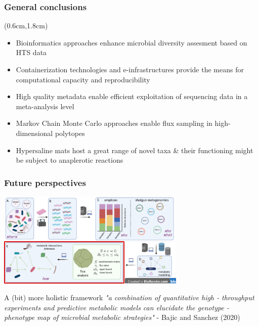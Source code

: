 \documentclass{beamer}
\begin{document}
   \begin{darkframes}

   \begin{frame}
      \frametitle{\textbf{General conclusions}}
      \begin{singlespace}
      \begin{textblock*}{11cm}(0.6cm,1.8cm)
      \small 
      \begin{itemize}
      
         \item Bioinformatics approaches enhance microbial diversity assesment based on HTS data
         \bigskip
         \item Containerization technologies and e-infrastructures provide the means for computational capacity and reproducibility
         \bigskip
         \item High quality metadata enable efficient exploitation of sequencing data in a meta-analysis level
         \bigskip
         \item Markov Chain Monte Carlo approaches enable flux sampling in high-dimensional polytopes 
         \bigskip
         \item Hypersaline mats host a great range of novel taxa \& their functioning might be subject to anaplerotic reactions
      \end{itemize}
      \end{textblock*}
   \end{singlespace}
   \end{frame}

   \begin{frame}
      \frametitle{Future perspectives}

      \includegraphics[width=90mm]{resources/reverse_ecology_transp_future.png}

      \begin{block}{A (bit) more holistic framework}
         \small
         \textit{
            "a combination of quantitative high - throughput experiments and predictive metabolic
            models can elucidate the genotype - phenotype map of microbial metabolic strategies"
         } - Bajic and Sanchez (2020)         %
         
      \end{block}

   \end{frame}
   \end{darkframes}
\end{document}

